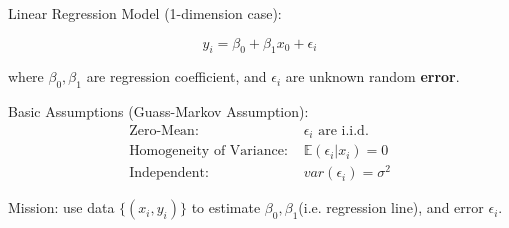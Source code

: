 \begin{point}
    Linear Regression Model (1-dimension case):
\end{point}

    \begin{equation}
        y_i=\beta_0+\beta_1x_0+\epsilon_i    
    \end{equation}

    where $\beta_0,\beta_1$ are regression coefficient, and $\epsilon_i$ are unknown random \textbf{error}. 
    
    Basic Assumptions (Guass-Markov Assumption):
    \begin{align}
        \text{Zero-Mean: }&\epsilon_i\text{ are i.i.d.}\\
        \text{Homogeneity of Variance: }&\mathbb{E}(\epsilon_i|x_i)=0\\
        \text{Independent: }&var(\epsilon_i)=\sigma^2
    \end{align}

    Mission: use data $\{(x_i,y_i)\}$ to estimate $\beta_0,\beta_1$(i.e. regression line), and error $\epsilon_i$.


